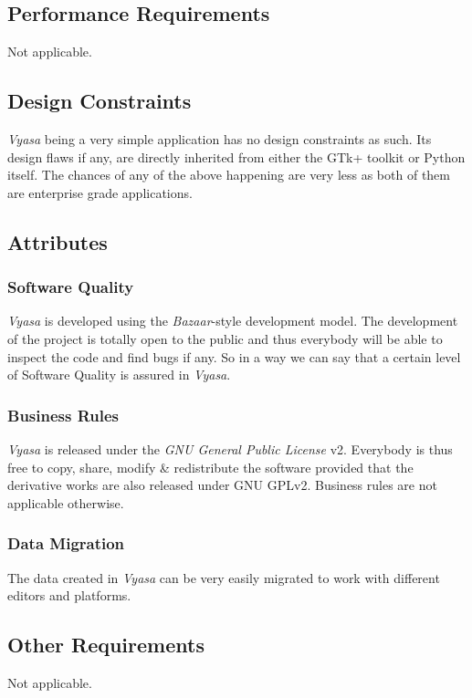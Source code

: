 \documentclass[12pt,a4paper]{article}
\newcommand{\VS}{\textit{Vyasa}}
\begin{document}
\subsection{Performance Requirements}
Not applicable.

\subsection{Design Constraints}
\VS{} being a very simple application has no design constraints as
such. Its design flaws if any, are directly inherited from either the
GTk+ toolkit or Python itself. The chances of any of the above happening
are very less as both of them are enterprise grade applications.

\subsection{Attributes}

\subsubsection{Software Quality}
\VS{} is developed using the \textit{Bazaar}-style development
model. The development of the project is totally open to the public and
thus everybody will be able to inspect the code and find bugs if any. So
in a way we can say that a certain level of Software Quality is assured
in \VS{}.

\subsubsection{Business Rules}
\VS{} is released under the \textit{GNU General Public
  License} v2. Everybody is thus free to copy, share, modify \&{}
redistribute the software provided that the derivative works are also
released under GNU GPLv2. Business rules are not applicable otherwise.

\subsubsection{Data Migration}
The data created in \VS{} can be very easily migrated to work with
different editors and platforms.

\subsection{Other Requirements}
Not applicable.



\end{document}
